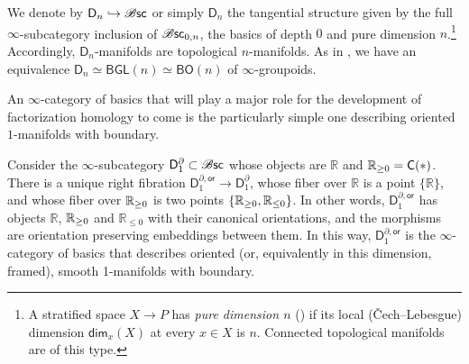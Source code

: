 \documentclass[../text]{subfiles}
\begin{document}
\begin{example}
    We denote by $\mathsf{D}_n\hookrightarrow \mathscr{B} \mathsf{sc}$ or simply $\mathsf{D}_n$ the tangential structure given by the full $\infty$-subcategory inclusion of $\mathscr{B} \mathsf{sc}_{0,n}$, the basics of depth $0$ and pure dimension $n$.\footnote{A stratified space $X\to P$ has \emph{pure dimension $n$} (\cite[Definition 2.4.1]{aft_localstrut}) if its local (\v{C}ech--Lebesgue) dimension $\mathsf{dim}_x(X)$ at every $x\in X$ is $n$. Connected topological manifolds are of this type.} Accordingly, $\mathsf{D}_n$-manifolds are topological $n$-manifolds. As in , we have an equivalence $\mathsf{D}_n\simeq \mathsf{BGL}(n)\simeq \mathsf{BO}(n)$ of $\infty$-groupoids.
\end{example}

An $\infty$-category of basics that will play a major role for the development of factorization homology to come is the particularly simple one describing oriented $1$-manifolds with boundary.

\begin{construction}\label{con:d_1^bor_structure}
    Consider the $\infty$-subcategory $\mathsf{D}_1^{\partial} \subset \mathscr{B} \mathsf{sc}$ whose objects are $\mathbb{R}$ and $\hoint = \cone(\ast)$. There is a unique right fibration $\mathsf{D}_1^{\partial, \mathsf{or}} \rightarrow \mathsf{D}_1^{\partial}$, whose fiber over $\mathbb{R}$ is a point $\{ \mathbb{R}\}$, and whose fiber over $\mathbb{R}_{\geq 0}$ is two points $\{ \mathbb{R}_{\geq 0}, {\mathbb{R}_{\leq 0}} \}$. In other words, $\mathsf{D}_1^{\partial, \mathsf{or}}$ has objects $\mathbb{R}$, $\mathbb{R}_{\geq 0}$ and $\mathbb{R}_{\leq 0}$ with their canonical orientations, and the morphisms are orientation preserving embeddings between them. In this way, $\mathsf{D}_1^{\partial, \mathsf{or}}$ is the $\infty$-category of basics that describes oriented (or, equivalently in this dimension, framed), smooth 1-manifolds with boundary.
\end{construction}
\end{document}

